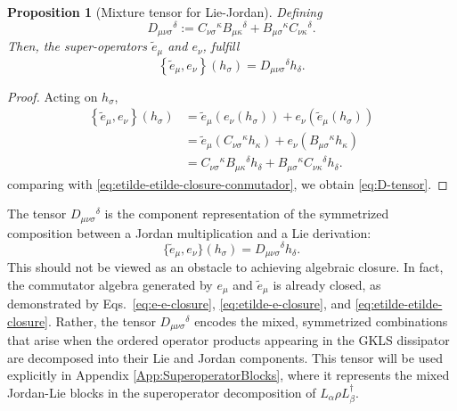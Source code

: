 \documentclass[notitlepage,aip,reprint,onecolumn]{revtex4-1}
\newtheorem{proposition}[theorem]{Proposition}
\theoremstyle{definition}
\newcommand{\acom}[2]{\left\{#1,#2\right\}}
\begin{document}
\begin{proposition}[Mixture tensor for Lie-Jordan]
Defining
\begin{equation} \label{eq:D-tensor}
     D_{\mu\nu\sigma}{}^\delta
     :=C_{\nu\sigma}{}^\kappa B_{\mu\kappa}{}^\delta
     +B_{\mu\sigma}{}^\kappa C_{\nu\kappa}{}^\delta.
\end{equation}
Then, the super-operators \(\widetilde e_\mu\) and \(e_\nu\), fulfill
\begin{equation}\label{eq:etilde-etilde-closure-conmutador}
     \acom{\widetilde e_\mu}{e_\nu}(h_\sigma)
     =D_{\mu\nu\sigma}{}^\delta h_\delta.
\end{equation}
\end{proposition}
\begin{proof}
Acting on $h_\sigma$,
\begin{align*}
     \acom{\widetilde e_\mu}{e_\nu}(h_\sigma)
     &=\widetilde e_\mu(e_\nu(h_\sigma))+e_\nu(\widetilde e_\mu(h_\sigma))
     \\
     &=\widetilde e_\mu(C_{\nu\sigma}{}^\kappa h_\kappa)
     +e_\nu(B_{\mu\sigma}{}^\kappa h_\kappa)
     \\
     &=C_{\nu\sigma}{}^\kappa B_{\mu\kappa}{}^\delta h_\delta
     +B_{\mu\sigma}{}^\kappa C_{\nu\kappa}{}^\delta h_\delta.
\end{align*}
comparing with \eqref{eq:etilde-etilde-closure-conmutador}, we obtain \eqref{eq:D-tensor}.
\end{proof}
The tensor \(D_{\mu\nu\sigma}{}^\delta\) is the component representation of the symmetrized composition between a Jordan multiplication and a Lie derivation:
\[
    \{\widetilde e_\mu,e_\nu\}(h_\sigma)
    =
    D_{\mu\nu\sigma}{}^\delta h_\delta.
\]
This should not be viewed as an obstacle to achieving algebraic closure. In fact, the commutator algebra generated by \(e_\mu\) and \(\widetilde e_\mu\) is already closed, as demonstrated by Eqs.~\eqref{eq:e-e-closure}, \eqref{eq:etilde-e-closure}, and \eqref{eq:etilde-etilde-closure}. Rather, the tensor \(D_{\mu\nu\sigma}{}^\delta\) encodes the mixed, symmetrized combinations that arise when the ordered operator products appearing in the GKLS dissipator are decomposed into their Lie and Jordan components.
%
This tensor will be used explicitly in Appendix \ref{App:SuperoperatorBlocks}, where it represents the mixed Jordan-Lie blocks in the superoperator decomposition of \(L_\alpha\rho L_\beta^\dagger\).
\end{document}
